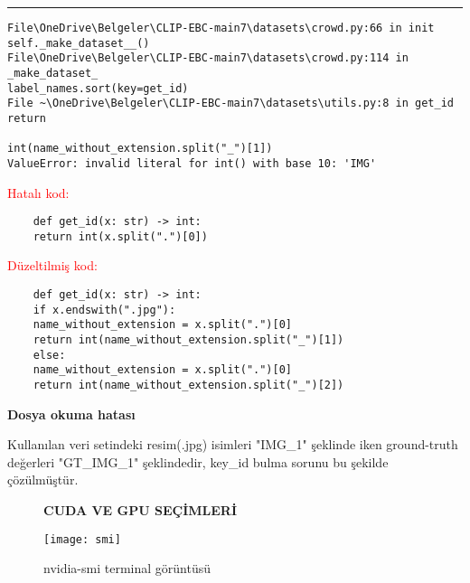 \documentclass[10pt,a4paper]{report}
\begin{document}
\begin{justify}
\rule{\linewidth}{0.65pt}
 	\begin{verbatim}
File\OneDrive\Belgeler\CLIP-EBC-main7\datasets\crowd.py:66 in init
self._make_dataset__()
File\OneDrive\Belgeler\CLIP-EBC-main7\datasets\crowd.py:114 in _make_dataset_
label_names.sort(key=get_id)
File ~\OneDrive\Belgeler\CLIP-EBC-main7\datasets\utils.py:8 in get_id return
	
int(name_without_extension.split("_")[1])
ValueError: invalid literal for int() with base 10: 'IMG' 
\end{verbatim}
\textcolor{red}{Hatalı kod:}
\begin{verbatim}
	def get_id(x: str) -> int:
	return int(x.split(".")[0])
\end{verbatim}\newline
\textcolor{red}{Düzeltilmiş kod:}
\begin{verbatim}
	def get_id(x: str) -> int:
	if x.endswith(".jpg"):
	name_without_extension = x.split(".")[0]
	return int(name_without_extension.split("_")[1])
	else:
	name_without_extension = x.split(".")[0]
	return int(name_without_extension.split("_")[2])
\end{verbatim}

\centering \textbf{Dosya okuma hatası}\newline

\begin{justify}
Kullanılan veri setindeki resim(.jpg) isimleri "IMG\_1" şeklinde iken 
ground-truth değerleri "GT\_IMG\_1" şeklindedir, key\_id bulma sorunu bu şekilde çözülmüştür.
\end{justify}


\begin{landscape} %
	
	
\begin{figure}[!h] %
		\centering
		\textbf{CUDA VE GPU SEÇİMLERİ}
		
		
		\begin{minipage}[t]{0.970\linewidth}
			\centering
			\texttt{[image: smi]}
			\caption{nvidia-smi terminal görüntüsü}
		\end{minipage}
		
		
		
\end{figure}
	
\end{landscape}


\begin{landscape} %
	

\end{landscape}
\end{justify}
\end{document}
